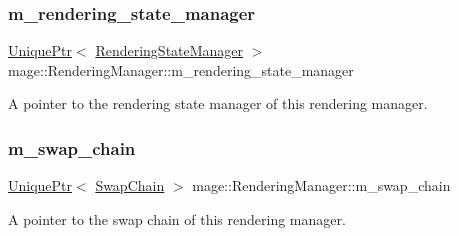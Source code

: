 \subsubsection{\texorpdfstring{m\+\_\+rendering\+\_\+state\+\_\+manager}{m\_rendering\_state\_manager}}
{\footnotesize\ttfamily \hyperlink{namespacemage_a3316d7143a973e37adf1110f2e80ca31}{Unique\+Ptr}$<$ \hyperlink{classmage_1_1_rendering_state_manager}{Rendering\+State\+Manager} $>$ mage\+::\+Rendering\+Manager\+::m\+\_\+rendering\+\_\+state\+\_\+manager\hspace{0.3cm}{\ttfamily [private]}}

A pointer to the rendering state manager of this rendering manager. \hypertarget{classmage_1_1_rendering_manager_acec25677bd92ddca6cb18efc1ed5fb38}{}\label{classmage_1_1_rendering_manager_acec25677bd92ddca6cb18efc1ed5fb38} 
\subsubsection{\texorpdfstring{m\+\_\+swap\+\_\+chain}{m\_swap\_chain}}
{\footnotesize\ttfamily \hyperlink{namespacemage_a3316d7143a973e37adf1110f2e80ca31}{Unique\+Ptr}$<$ \hyperlink{classmage_1_1_swap_chain}{Swap\+Chain} $>$ mage\+::\+Rendering\+Manager\+::m\+\_\+swap\+\_\+chain\hspace{0.3cm}{\ttfamily [private]}}

A pointer to the swap chain of this rendering manager. 